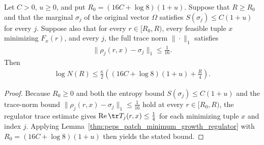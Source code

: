 \begin{lemma}
    \label{thm:peps_patch_minimum_growth_entropy_distance}
    \leanok
    Let $C>0$, $u\ge0$, and put $R_0=(16C+\log8)(1+u)$.
    Suppose that $R\ge R_0$ and that the marginal $\sigma_j$ of the original
    vector $\Omega$ satisfies $S(\sigma_j)\le C(1+u)$ for every $j$.
    Suppose also that for every $r\in[R_0,R)$, every feasible tuple $x$
    minimizing $F_x(r)$, and every $j$, the full trace norm $\|\cdot\|_1$
    satisfies
    \begin{align*}
        \|\rho_j(r,x)-\sigma_j\|_1\le\frac1{16}.
    \end{align*}
    Then
    \begin{align*}
        \log N(R)\le\frac{\kappa}{2}
        \left((16C+\log8)(1+u)+\frac R4\right).
    \end{align*}
\end{lemma}
\begin{proof}\leanok
    Because $R_0\ge0$ and both the entropy bound $S(\sigma_j)\le C(1+u)$ and the
    trace-norm bound $\|\rho_j(r,x)-\sigma_j\|_1\le\tfrac1{16}$ hold at every
    $r\in[R_0,R)$, the regulator trace estimate gives
    $\operatorname{Re}\tr T_j(r,x)\le\tfrac14$ for each minimizing tuple $x$
    and index $j$. Applying Lemma~\ref{thm:peps_patch_minimum_growth_regulator}
    with $R_0=(16C+\log8)(1+u)$ then yields the stated bound.
\end{proof}

